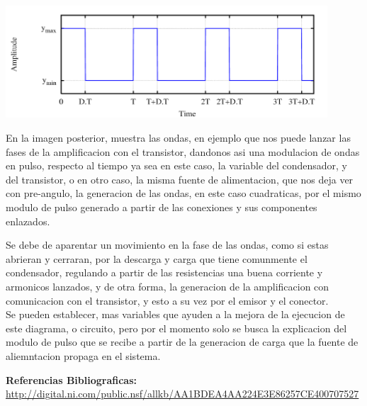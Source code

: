\documentclass[12pt,a4paper]{article}
\begin{document}
\begin{center}
\includegraphics[width=12cm]{onda.png} 
\end{center}

En la imagen posterior, muestra las ondas, en ejemplo que nos puede lanzar las fases de la amplificacion con el transistor, dandonos asi una modulacion de ondas en pulso, respecto al tiempo ya sea en este caso, la variable del condensador, y del transistor, o en otro caso, la misma fuente de alimentacion, que nos deja ver con pre-angulo, la generacion de las ondas, en este caso cuadraticas, por el mismo modulo de pulso generado a partir de las conexiones y sus componentes enlazados.

Se debe de aparentar un movimiento en la fase de las ondas, como si estas abrieran y cerraran, por la descarga y carga que tiene comunmente el condensador, regulando a partir de las resistencias una buena corriente y armonicos lanzados, y de otra forma, la generacion de la amplificacion con comunicacion con el transistor, y esto a su vez por el emisor y el conector.\\

Se pueden establecer, mas variables que ayuden a la mejora de la ejecucion de este diagrama, o circuito, pero por el momento solo se busca la explicacion del modulo de pulso que se recibe a partir de la generacion de carga que la fuente de aliemntacion propaga en el sistema.
\newpage

\textbf{\LARGE Referencias Bibliograficas:}\\

\url{http://digital.ni.com/public.nsf/allkb/AA1BDEA4AA224E3E86257CE400707527}
\end{document}
